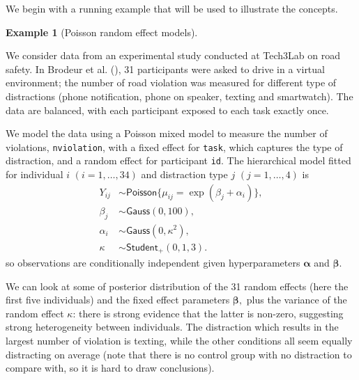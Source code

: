 \documentclass[
  11pt,
  letterpaper,
]{scrbook}
\theoremstyle{definition}
\theoremstyle{plain}
\theoremstyle{plain}
\theoremstyle{plain}
\theoremstyle{definition}
\newtheorem{example}{Example}[chapter]
\theoremstyle{definition}
\theoremstyle{remark}
\begin{document}
We begin with a running example that will be used to illustrate the
concepts.

\begin{example}[Poisson random effect
models]\protect\hypertarget{exm-randomeffects}{}\label{exm-randomeffects}

We consider data from an experimental study conducted at Tech3Lab on
road safety. In Brodeur et al. (), 31
participants were asked to drive in a virtual environment; the number of
road violation was measured for different type of distractions (phone
notification, phone on speaker, texting and smartwatch). The data are
balanced, with each participant exposed to each task exactly once.

We model the data using a Poisson mixed model to measure the number of
violations, \texttt{nviolation}, with a fixed effect for \texttt{task},
which captures the type of distraction, and a random effect for
participant \texttt{id}. The hierarchical model fitted for individual
\(i\) \((i=1, \ldots, 34)\) and distraction type \(j\)
\((j=1, \ldots, 4)\) is \begin{align*}
Y_{ij} &\sim \mathsf{Poisson}\{\mu_{ij} = \exp(\beta_{j} + \alpha_i)\},\\
\beta_j &\sim \mathsf{Gauss}(0, 100), \\
\alpha_i &\sim \mathsf{Gauss}(0, \kappa^2), \\
\kappa &\sim \mathsf{Student}_{+}(0,1,3).
\end{align*} so observations are conditionally independent given
hyperparameters \(\boldsymbol{\alpha}\) and \(\boldsymbol{\beta}.\)

We can look at some of posterior distribution of the 31 random effects
(here the first five individuals) and the fixed effect parameters
\(\boldsymbol{\beta},\) plus the variance of the random effect
\(\kappa\): there is strong evidence that the latter is non-zero,
suggesting strong heterogeneity between individuals. The distraction
which results in the largest number of violation is texting, while the
other conditions all seem equally distracting on average (note that
there is no control group with no distraction to compare with, so it is
hard to draw conclusions).

\begin{figure}[ht!]

\centering{

}
\end{figure}
\end{example}
\end{document}

